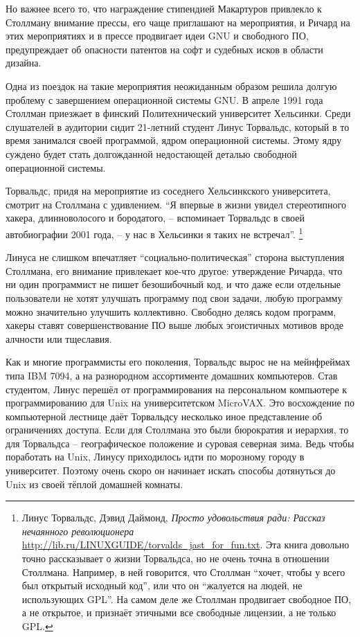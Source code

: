Но важнее всего то, что награждение стипендией Макартуров привлекло к Столлману внимание прессы, его чаще приглашают на мероприятия, и Ричард на этих мероприятиях и в прессе продвигает идеи GNU и свободного ПО, предупреждает об опасности патентов на софт и судебных исков в области дизайна.

Одна из поездок на такие мероприятия неожиданным образом решила долгую проблему с завершением операционной системы GNU. В апреле 1991 года Столлман приезжает в финский Политехнический университет Хельсинки. Среди слушателей в аудитории сидит 21-летний студент Линус Торвальдс, который в то время занимался своей программой, ядром операционной системы. Этому ядру суждено будет стать долгожданной недостающей деталью свободной операционной системы.

Торвальдс, придя на мероприятие из соседнего Хельсинкского университета, смотрит на Столлмана с удивлением. \enquote{Я впервые в жизни увидел стереотипного хакера, длинноволосого и бородатого, -- вспоминает Торвальдс в своей автобиографии 2001 года, -- у нас в Хельсинки я таких не встречал}. \footnote{Линус Торвальдс, Дэвид Даймонд, \textit{Просто удовольствия ради: Рассказ нечаянного революционера} \url{http://lib.ru/LINUXGUIDE/torvalds_jast_for_fun.txt}. Эта книга довольно точно рассказывает о жизни Торвальдса, но не очень точна в отношении Столлмана. Например, в ней говорится, что Столлман \enquote{хочет, чтобы у всего был открытый исходный код}, или что он \enquote{жалуется на людей, не использующих GPL}. На самом деле же Столлман продвигает свободное ПО, а не открытое, и признаёт этичными все свободные лицензии, а не только GPL.}

Линуса не слишком впечатляет \enquote{социально-политическая} сторона выступления Столлмана, его внимание привлекает кое-что другое: утверждение Ричарда, что ни один программист не пишет безошибочный код, и что даже если отдельные пользователи не хотят улучшать программу под свои задачи, любую программу можно значительно улучшить коллективно. Свободно делясь кодом программ, хакеры ставят совершенствование ПО выше любых эгоистичных мотивов вроде алчности или тщеславия.

Как и многие программисты его поколения, Торвальдс вырос не на мейнфреймах типа IBM 7094, а на разнородном ассортименте домашних компьютеров. Став студентом, Линус перешёл от программирования на персональном компьютере к программированию для Unix на университетском MicroVAX. Это восхождение по компьютерной лестнице даёт Торвальдсу несколько иное представление об ограничениях доступа. Если для Столлмана это были бюрократия и иерархия, то для Торвальдса -- географическое положение и суровая северная зима. Ведь чтобы поработать на Unix, Линусу приходилось идти по морозному городу в университет. Поэтому очень скоро он начинает искать способы дотянуться до Unix из своей тёплой домашней комнаты.

